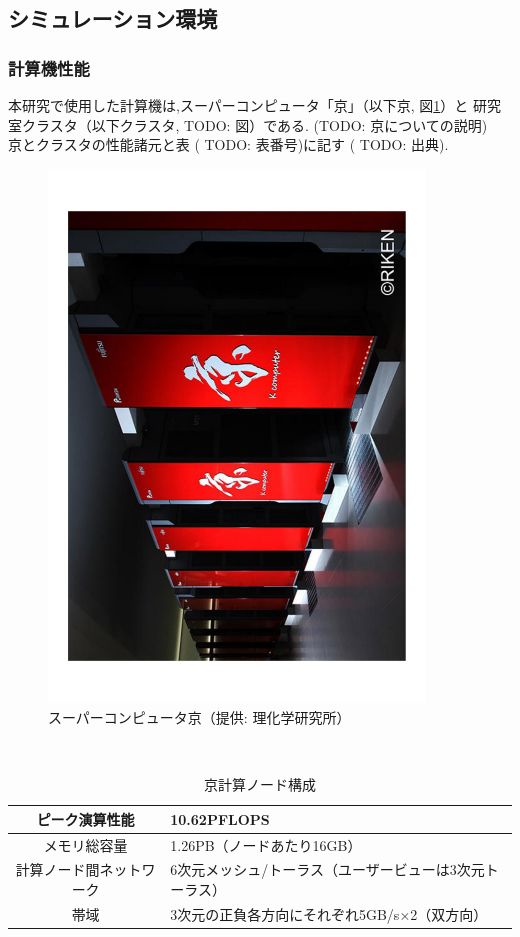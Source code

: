 \subsection{シミュレーション環境}
\subsubsection{計算機性能}
本研究で使用した計算機は,スーパーコンピュータ「京」（以下京, 図\ref{fig:k}）と
研究室クラスタ（以下クラスタ, TODO: 図）である. (TODO: 京についての説明)\\
京とクラスタの性能諸元と表 ( TODO: 表番号)に記す ( TODO: 出典).\\

\begin{figure}[htb]
  \begin{center}
    \includegraphics[width=10.0cm, angle=-90]{./images/k}
    \caption{スーパーコンピュータ京（提供: 理化学研究所）}
    \label{fig:k}
  \end{center}
\end{figure}~\\
\begin{table}[t]
  \begin{center}
    \begin{tabular}{|c|p{12cm}|}
      \hline
      ピーク演算性能 & 10.62PFLOPS \\ \hline
      メモリ総容量 & 1.26PB（ノードあたり16GB）\\ \hline
      計算ノード間ネットワーク & 6次元メッシュ/トーラス（ユーザービューは3次元トーラス）\\ \hline
      帯域 & 3次元の正負各方向にそれぞれ5GB/s×2（双方向）\\ \hline
    \end{tabular}
  \end{center}
  \caption{京計算ノード構成}
\end{table}~\\
